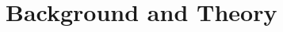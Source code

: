 \documentclass[a4paper,12pt]{article}
\begin{document}
%


\section{Background and Theory}

%
%
\end{document}
